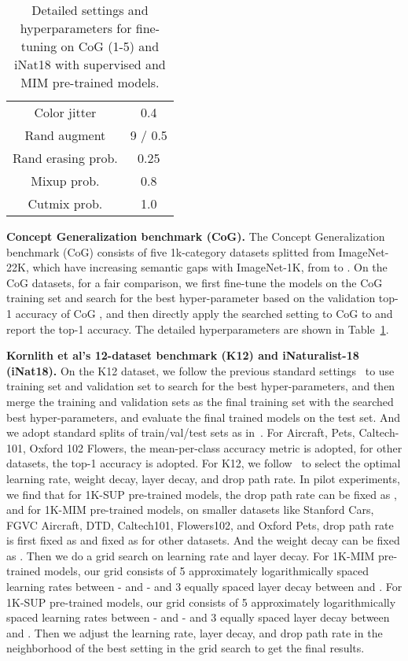 \documentclass{article}
\begin{document}
\begin{table}[h]
\begin{tabular}{c|cccccc}
    Color jitter & \multicolumn{6}{c}{0.4}\\
    Rand augment & \multicolumn{6}{c}{9 / 0.5} \\
    Rand erasing prob. & \multicolumn{6}{c}{0.25}\\
    Mixup prob. & \multicolumn{6}{c}{0.8} \\
    Cutmix prob. & \multicolumn{6}{c}{1.0} \\
    \bottomrule
    \end{tabular}
    \vspace{0.5em}
    \caption{Detailed settings and hyperparameters for fine-tuning on CoG (1-5) and iNat18 with supervised and MIM pre-trained models.}
    \label{table:setting-finetune}
\end{table}

\noindent\textbf{Concept Generalization benchmark (CoG).}
The Concept Generalization benchmark (CoG) consists of five 1k-category datasets splitted from ImageNet-22K, which have increasing semantic gaps with ImageNet-1K, from  to .
On the CoG datasets, for a fair comparison, we first fine-tune the models on the CoG  training set and search for the best hyper-parameter based on the validation top-1 accuracy of CoG , and then directly apply the searched setting to CoG  to  and report the top-1 accuracy. 
The detailed hyperparameters are shown in Table~\ref{table:setting-finetune}.


\noindent\textbf{Kornlith et al's 12-dataset benchmark (K12) and iNaturalist-18 (iNat18).} 
On the K12 dataset, we follow the previous standard settings~\cite{kornblith2019better} to use training set and validation set to search for the best hyper-parameters, and then merge the training and validation sets as the final training set with the searched best hyper-parameters, and evaluate the final trained models on the test set. And we adopt standard splits of train/val/test sets as in~\cite{kornblith2019better}. For Aircraft, Pets, Caltech-101, Oxford 102 Flowers, the mean-per-class accuracy metric is adopted, for other datasets, the top-1 accuracy is adopted.
For K12, we follow~\cite{kornblith2019better} to select the optimal learning rate, weight decay, layer decay, and drop path rate. 
In pilot experiments, we find that for 1K-SUP pre-trained models, the drop path rate can be fixed as , and for 1K-MIM pre-trained models, on smaller datasets like Stanford Cars, FGVC Aircraft, DTD,  Caltech101, Flowers102, and Oxford Pets, drop path rate is first fixed as  and fixed as  for other datasets. And the weight decay can be fixed as .
Then we do a grid search on learning rate and layer decay. For 1K-MIM pre-trained models, our grid consists of 5 approximately logarithmically spaced learning rates between - and - and 3 equally spaced layer decay between  and . For 1K-SUP pre-trained models, our grid consists of 5 approximately logarithmically spaced learning rates between - and - and 3 equally spaced layer decay between  and . Then we adjust the learning rate, layer decay, and drop path rate in the neighborhood of the best setting in the grid search to get the final results. 
\end{document}
